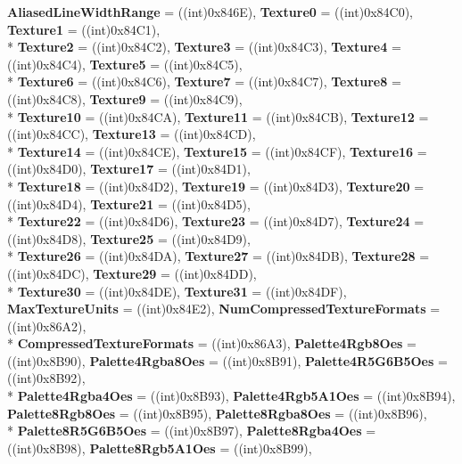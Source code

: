 \begin{DoxyCompactItemize}
{\bfseries Aliased\-Line\-Width\-Range} = ((int)0x846\-E), 
{\bfseries Texture0} = ((int)0x84\-C0), 
{\bfseries Texture1} = ((int)0x84\-C1), 
\\*
{\bfseries Texture2} = ((int)0x84\-C2), 
{\bfseries Texture3} = ((int)0x84\-C3), 
{\bfseries Texture4} = ((int)0x84\-C4), 
{\bfseries Texture5} = ((int)0x84\-C5), 
\\*
{\bfseries Texture6} = ((int)0x84\-C6), 
{\bfseries Texture7} = ((int)0x84\-C7), 
{\bfseries Texture8} = ((int)0x84\-C8), 
{\bfseries Texture9} = ((int)0x84\-C9), 
\\*
{\bfseries Texture10} = ((int)0x84\-C\-A), 
{\bfseries Texture11} = ((int)0x84\-C\-B), 
{\bfseries Texture12} = ((int)0x84\-C\-C), 
{\bfseries Texture13} = ((int)0x84\-C\-D), 
\\*
{\bfseries Texture14} = ((int)0x84\-C\-E), 
{\bfseries Texture15} = ((int)0x84\-C\-F), 
{\bfseries Texture16} = ((int)0x84\-D0), 
{\bfseries Texture17} = ((int)0x84\-D1), 
\\*
{\bfseries Texture18} = ((int)0x84\-D2), 
{\bfseries Texture19} = ((int)0x84\-D3), 
{\bfseries Texture20} = ((int)0x84\-D4), 
{\bfseries Texture21} = ((int)0x84\-D5), 
\\*
{\bfseries Texture22} = ((int)0x84\-D6), 
{\bfseries Texture23} = ((int)0x84\-D7), 
{\bfseries Texture24} = ((int)0x84\-D8), 
{\bfseries Texture25} = ((int)0x84\-D9), 
\\*
{\bfseries Texture26} = ((int)0x84\-D\-A), 
{\bfseries Texture27} = ((int)0x84\-D\-B), 
{\bfseries Texture28} = ((int)0x84\-D\-C), 
{\bfseries Texture29} = ((int)0x84\-D\-D), 
\\*
{\bfseries Texture30} = ((int)0x84\-D\-E), 
{\bfseries Texture31} = ((int)0x84\-D\-F), 
{\bfseries Max\-Texture\-Units} = ((int)0x84\-E2), 
{\bfseries Num\-Compressed\-Texture\-Formats} = ((int)0x86\-A2), 
\\*
{\bfseries Compressed\-Texture\-Formats} = ((int)0x86\-A3), 
{\bfseries Palette4\-Rgb8\-Oes} = ((int)0x8\-B90), 
{\bfseries Palette4\-Rgba8\-Oes} = ((int)0x8\-B91), 
{\bfseries Palette4\-R5\-G6\-B5\-Oes} = ((int)0x8\-B92), 
\\*
{\bfseries Palette4\-Rgba4\-Oes} = ((int)0x8\-B93), 
{\bfseries Palette4\-Rgb5\-A1\-Oes} = ((int)0x8\-B94), 
{\bfseries Palette8\-Rgb8\-Oes} = ((int)0x8\-B95), 
{\bfseries Palette8\-Rgba8\-Oes} = ((int)0x8\-B96), 
\\*
{\bfseries Palette8\-R5\-G6\-B5\-Oes} = ((int)0x8\-B97), 
{\bfseries Palette8\-Rgba4\-Oes} = ((int)0x8\-B98), 
{\bfseries Palette8\-Rgb5\-A1\-Oes} = ((int)0x8\-B99), 

\end{DoxyCompactItemize}

